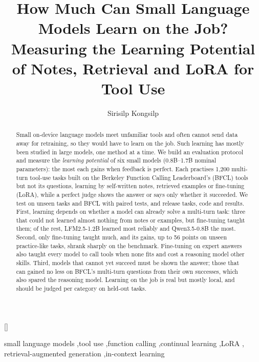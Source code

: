 \documentclass[a4paper,fleqn]{cas-dc}
\begin{document}
\title [mode = title]{How Much Can Small Language Models Learn on the Job?\\
Measuring the Learning Potential of Notes, Retrieval and LoRA for Tool Use}
\author[1,2]{Sirisilp Kongsilp}[]
\cormark[1]
\begin{abstract}
Small on-device language models meet unfamiliar tools and often cannot send data away for retraining, so they would
have to learn on the job. Such learning has mostly been studied in large models, one method at a time. We build an
evaluation protocol and measure the \emph{learning potential} of six small models (0.8B--1.7B nominal parameters):
the most each gains when feedback is perfect. Each practises 1,200 multi-turn tool-use tasks built on the Berkeley
Function Calling Leaderboard's (BFCL) tools but not its questions, learning by self-written notes, retrieved examples
or fine-tuning (LoRA), while a perfect judge shows the answer or says only whether it succeeded. We test on unseen
tasks and BFCL with paired tests, and release tasks, code and results. First, learning depends on whether a model
can already solve a multi-turn task: three that could not learned almost nothing from notes or examples, but
fine-tuning taught them; of the rest, LFM2.5-1.2B learned most reliably and Qwen3.5-0.8B the most. Second, only
fine-tuning taught much, and its gains, up to 56 points on unseen practice-like tasks, shrank sharply on the
benchmark. Fine-tuning on expert answers also taught every model to call tools when none fits and cost a reasoning
model other skills. Third, models that cannot yet succeed must be shown the answer; those that can gained no less on BFCL's
multi-turn questions from their own successes, which also spared the reasoning model. Learning on the job is real but mostly
local, and should be judged per category on held-out tasks.
\end{abstract}
\begin{keywords}
small language models \sep tool use \sep function calling \sep continual learning \sep LoRA \sep
retrieval-augmented generation \sep in-context learning
\end{keywords}
\maketitle
\end{document}
